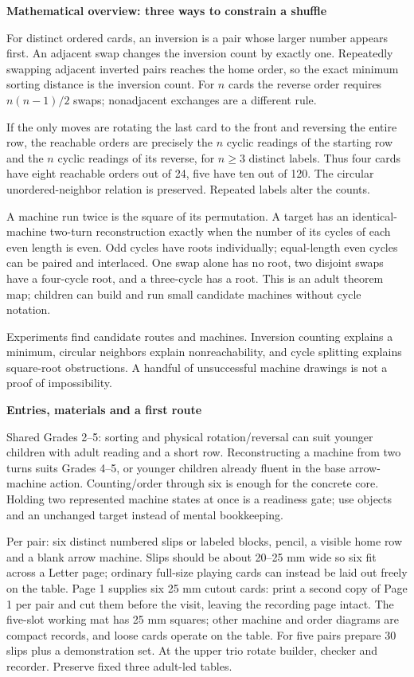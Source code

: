 \documentclass[11pt]{article}
\newcommand\lead[1]{\textbf{#1}\par}
\begin{document}
\lead{Mathematical overview: three ways to constrain a shuffle}
For distinct ordered cards, an inversion is a pair whose larger number appears first. An adjacent swap changes the inversion count by exactly one. Repeatedly swapping adjacent inverted pairs reaches the home order, so the exact minimum sorting distance is the inversion count. For $n$ cards the reverse order requires $n(n-1)/2$ swaps; nonadjacent exchanges are a different rule.

If the only moves are rotating the last card to the front and reversing the entire row, the reachable orders are precisely the $n$ cyclic readings of the starting row and the $n$ cyclic readings of its reverse, for $n\ge 3$ distinct labels. Thus four cards have eight reachable orders out of 24, five have ten out of 120. The circular unordered-neighbor relation is preserved. Repeated labels alter the counts.

A machine run twice is the square of its permutation. A target has an identical-machine two-turn reconstruction exactly when the number of its cycles of each even length is even. Odd cycles have roots individually; equal-length even cycles can be paired and interlaced. One swap alone has no root, two disjoint swaps have a four-cycle root, and a three-cycle has a root. This is an adult theorem map; children can build and run small candidate machines without cycle notation.

Experiments find candidate routes and machines. Inversion counting explains a minimum, circular neighbors explain nonreachability, and cycle splitting explains square-root obstructions. A handful of unsuccessful machine drawings is not a proof of impossibility.

\lead{Entries, materials and a first route}
Shared Grades 2--5: sorting and physical rotation/reversal can suit younger children with adult reading and a short row. Reconstructing a machine from two turns suits Grades 4--5, or younger children already fluent in the base arrow-machine action. Counting/order through six is enough for the concrete core. Holding two represented machine states at once is a readiness gate; use objects and an unchanged target instead of mental bookkeeping.

Per pair: six distinct numbered slips or labeled blocks, pencil, a visible home row and a blank arrow machine. Slips should be about 20--25 mm wide so six fit across a Letter page; ordinary full-size playing cards can instead be laid out freely on the table. Page 1 supplies six 25 mm cutout cards: print a second copy of Page 1 per pair and cut them before the visit, leaving the recording page intact. The five-slot working mat has 25 mm squares; other machine and order diagrams are compact records, and loose cards operate on the table. For five pairs prepare 30 slips plus a demonstration set. At the upper trio rotate builder, checker and recorder. Preserve fixed three adult-led tables.
\end{document}
